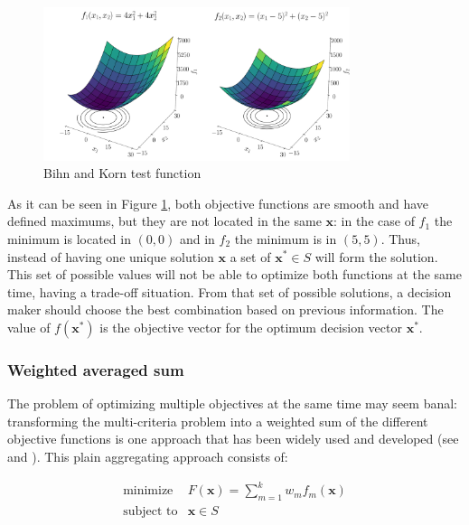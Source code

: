     \begin{figure}[h!]
        \centering
        \includegraphics[width=0.8\textwidth]{Figures/2/BK2.pdf}
        \caption{Bihn and Korn test function}
        \label{fig:BihnKorn}
    \end{figure}

\newpage    
    
    As it can be seen in Figure \ref{fig:BihnKorn}, both objective functions are smooth and have defined maximums, but they are not located in the same $\bm{x}$: in the case of $f_1$ the minimum is located in $(0,0)$ and in $f_2$ the minimum is in $(5,5)$. Thus, instead of having one unique solution $\bm{x}$ a set of $\bm{x^*} \in S$ will form the  solution. This set of possible values will not be able to optimize both functions at the same time, having a trade-off situation. From that set of possible solutions, a decision maker should choose the best combination based on previous information. The value of $f(\bm{x^*})$ is the objective vector for the optimum decision vector $\bm{x^*}$.

\subsubsection*{Weighted averaged sum}

    The problem of optimizing multiple objectives at the same time may seem banal: transforming the multi-criteria problem into a weighted sum of the different objective functions is one approach that has been widely used and developed (see \cite{stanimirovic2011linear} and \cite{kim2006adaptive}). This plain aggregating approach consists of:
    
    \begin{equation}
        \begin{array}{cl}
            \textrm{minimize} & F(\bm{x}) = \displaystyle \sum_{m=1}^{k}  w_m f_m(\bm{x}) \\
            \textrm{subject to} & \bm{x} \in S
        \end{array}
        \label{eq:weightedSum}
    \end{equation}
    
